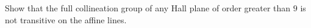 Show that the full collineation group of any Hall plane of order greater than $9$ is not transitive on the affine lines.
